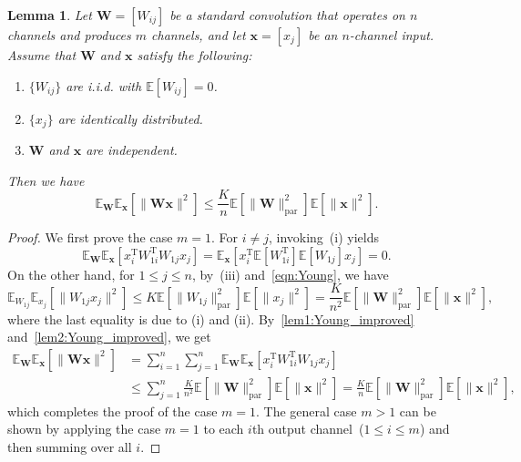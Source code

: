 \documentclass[preprint,12pt,authoryear]{elsarticle}
\numberwithin{equation}{section}
\newtheorem{lemma}[theorem]{Lemma}
\theoremstyle{remark}
\newcommand\bW{\mathbf{W}}
\newcommand\bx{\mathbf{x}}
\newcommand\rT{\mathrm{T}}
\newcommand\bbE{\mathbb{E}}
\newcommand\param{\mathrm{par}}
\begin{document}
\begin{lemma}
    \label{lem:Young_improved}
    Let $\bW = [W_{ij}]$ be a standard convolution that operates on $n$ channels and produces $m$ channels, and let $\bx = [x_j]$ be an $n$-channel input.
    Assume that $\bW$ and $\bx$ satisfy the following:
    \begin{enumerate}[label=\emph{(\roman*)}]
        \item $\{ W_{ij} \}$ are i.i.d. with $\bbE [W_{ij}] = 0$.
        \item $\{ x_j \}$ are identically distributed.
        \item $\bW$ and $\bx$ are independent.
    \end{enumerate}
    Then we have
    \begin{equation*}
        \bbE_{\bW} \bbE_{\bx} \left[ \| \bW \bx \|^2 \right]
        \leq \frac{K}{n} \bbE \left[ \| \bW \|_{\param}^2 \right] \bbE \left[ \| \bx \|^2 \right].
    \end{equation*}
\end{lemma}
\begin{proof}
We first prove the case $m = 1$.
For $i \neq j$, invoking~(i) yields
\begin{equation}
    \label{lem1:Young_improved}
    \bbE_{\bW} \bbE_{\bx} \left[ x_i^{\rT} W_{1i}^{\rT} W_{1j} x_j \right]
    = \bbE_{\bx} \left[ x_i^\rT  \bbE \left[ W_{1i}^{\rT}\right] \bbE \left[ W_{1j} \right] x_j \right] = 0.
\end{equation}
On the other hand, for $1 \leq j \leq n$, by~(iii) and~\eqref{eqn:Young}, we have
\begin{equation}
    \label{lem2:Young_improved}
    \bbE_{W_{1j}} \bbE_{x_j} \left[ \| W_{1j} x_j \|^2 \right]
    \leq K \bbE \left[ \| W_{1j} \|_{\param}^2 \right] \bbE \left[ \|x_j\|^2 \right]
    = \frac{K}{n^2} \bbE \left[ \| \bW \|_{\param}^2 \right] \bbE \left[ \| \bx \|^2 \right],
\end{equation}
where the last equality is due to (i) and (ii).
By~\eqref{lem1:Young_improved} and~\eqref{lem2:Young_improved}, we get
\begin{align*}
    \bbE_{\bW} \bbE_{\bx} \left[ \| \bW \bx \|^2 \right]
    &= \sum_{i=1}^n \sum_{j=1}^n \bbE_{\bW} \bbE_{\bx} \left[ x_i^{\rT} W_{1i}^{\rT} W_{1j} x_j \right] \\
    &\leq \sum_{j=1}^n \frac{K}{n^2} \bbE \left[ \| \bW \|_{\param}^2 \right] \bbE \left[ \| \bx \|^2 \right]
    = \frac{K}{n} \bbE \left[ \| \bW \|_{\param}^2 \right] \bbE \left[ \| \bx \|^2 \right],
\end{align*}
which completes the proof of the case $m = 1$.
The general case $m > 1$ can be shown by applying the case $m = 1$ to each $i$th output channel~($1 \leq i \leq m$) and then summing over all $i$.
\end{proof}
\end{document}
